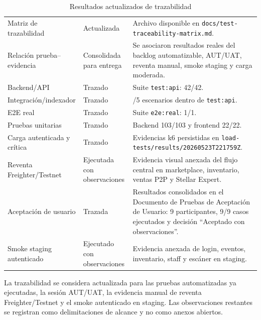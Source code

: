 \documentclass[12pt,letterpaper]{article}
\begin{document}
\begin{table}[H]
\centering
\begingroup
\scriptsize
\setlength{\tabcolsep}{3pt}
\renewcommand{\arraystretch}{1.18}

\begin{tabularx}{\textwidth}{|
>{\raggedright\arraybackslash}p{3.8cm}|
>{\centering\arraybackslash}p{2.4cm}|
>{\raggedright\arraybackslash}X|}
\hline
\multicolumn{1}{|>{\centering\arraybackslash}m{3.8cm}|}{\textbf{Elemento}} &
\multicolumn{1}{>{\centering\arraybackslash}m{2.4cm}|}{\textbf{Estado}} &
\multicolumn{1}{>{\centering\arraybackslash}m{8.1cm}|}{\textbf{Observación}} \\
\hline
Matriz de trazabilidad & Actualizada & Archivo disponible en \texttt{docs/test-traceability-matrix.md}. \\
\hline
Relación prueba--evidencia & Consolidada para entrega & Se asociaron resultados reales del backlog automatizable, AUT/UAT, reventa manual, smoke staging y carga moderada. \\
\hline
Backend/API & Trazado & Suite \texttt{test:api}: 42/42. \\
\hline
Integración/indexador & Trazado & 5/5 escenarios dentro de \texttt{test:api}. \\
\hline
E2E real & Trazado & Suite \texttt{e2e:real}: 1/1. \\
\hline
Pruebas unitarias & Trazado & Backend 103/103 y frontend 22/22. \\
\hline
Carga autenticada y crítica & Trazado & Evidencias k6 persistidas en \texttt{load-tests/results/20260523T221759Z}. \\
\hline
Reventa Freighter/Testnet & Ejecutada con observaciones & Evidencia visual anexada del flujo central en marketplace, inventario, ventas P2P y Stellar Expert. \\
\hline
Aceptación de usuario & Trazada & Resultados consolidados en el Documento de Pruebas de Aceptación de Usuario: 9 participantes, 9/9 casos ejecutados y decisión ``Aceptado con observaciones''. \\
\hline
Smoke staging autenticado & Ejecutado con observaciones & Evidencia anexada de login, eventos, inventario, staff y escáner en staging. \\
\hline
\end{tabularx}

\endgroup
\caption{Resultados actualizados de trazabilidad}
\label{tab:trazabilidad-actualizada}
\end{table}

La trazabilidad se considera actualizada para las pruebas automatizadas ya ejecutadas, la sesión AUT/UAT, la evidencia manual de reventa Freighter/Testnet y el smoke autenticado en staging. Las observaciones restantes se registran como delimitaciones de alcance y no como anexos abiertos.
\end{document}
